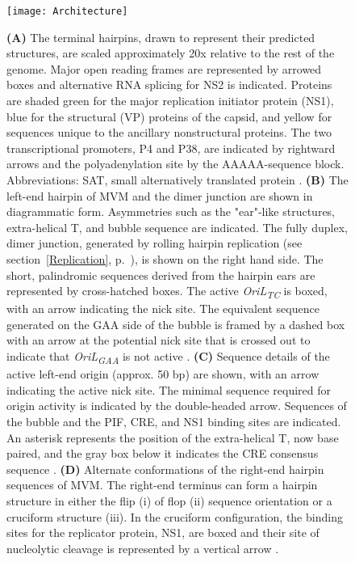 \begin{figure}
\centering
  \texttt{[image: Architecture]}
  \vspace{-8em}
  \caption[Genome architecture of minute virus of mice (MVM).]
   {\textbf{(A)} The terminal hairpins, drawn to represent their predicted structures, are scaled approximately 20x relative to the rest of the genome. Major open reading frames are represented by arrowed boxes and alternative RNA splicing for NS2 is indicated. Proteins are shaded green for the major replication initiator protein (NS1), blue for the structural (VP) proteins of the capsid, and yellow for sequences unique to the ancillary nonstructural proteins. The two transcriptional promoters, P4 and P38, are indicated by rightward arrows and the polyadenylation site by the AAAAA-sequence block. Abbreviations: SAT, small alternatively translated protein \cite{small}. \textbf{(B)} The left-end hairpin of MVM and the dimer junction are shown in diagrammatic form. Asymmetries such as the "ear"-like structures, extra-helical T, and bubble sequence are indicated. The fully duplex, dimer junction, generated by rolling hairpin replication (see section~\ref{Replication}, p.~\pageref{Replication}), is shown on the right hand side. The short, palindromic sequences derived from the hairpin ears are represented by cross-hatched boxes. The active \textit{OriL\textsubscript{TC}} is boxed, with an arrow indicating the nick site. The equivalent sequence generated on the GAA side of the bubble is framed by a dashed box with an arrow at the potential nick site that is crossed out to indicate that \textit{OriL\textsubscript{GAA}} is not active \cite{pmid12885883, pmid16928767}. \textbf{(C)} Sequence details of the active left-end origin (approx. 50 bp) are shown, with an arrow indicating the active nick site. The minimal sequence required for origin activity is indicated by the double-headed arrow. Sequences of the bubble and the PIF, CRE, and NS1 binding sites are indicated. An asterisk represents the position of the extra-helical T, now base paired, and the gray box below it indicates the CRE consensus sequence \cite{pmid12885883}. \textbf{(D)} Alternate conformations of the right-end hairpin sequences of MVM. The right-end terminus can form a hairpin structure in either the flip (i) of flop (ii) sequence orientation or a cruciform structure (iii). In the cruciform configuration, the binding sites for the replicator protein, NS1, are boxed and their site of nucleolytic cleavage is represented by a vertical arrow \cite{pmid8614999}.
} 
\label{Architecture}
\end{figure}


